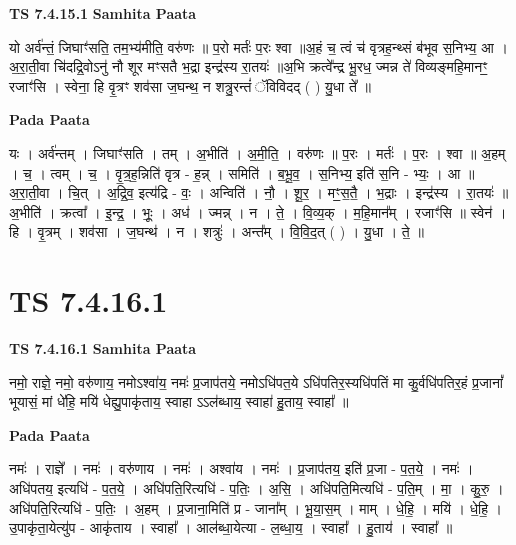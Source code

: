 \documentclass[17pt]{extarticle}
\begin{document}
\textbf{TS 7.4.15.1 } \newline
\textbf{Samhita Paata} \newline

यो अर्व॑न्तं॒ जिघाꣳ॑सति॒ तम॒भ्य॑मीति॒ वरु॑णः ॥ प॒रो मर्तः॑ प॒रः श्वा ॥अ॒हं च॒ त्वं च॑ वृत्रह॒न्थ्सं ब॑भूव स॒निभ्य॒ आ । अ॒रा॒ती॒वा चि॑दद्रि॒वोऽनु॑ नौ शूर मꣳसतै भ॒द्रा इन्द्र॑स्य रा॒तयः॑ ॥अ॒भि क्रत्वे᳚न्द्र भू॒रध॒ ज्मन्न ते॑ विव्यङ्महि॒मानꣳ॒॒ रजाꣳ॑सि । स्वेना॒ हि वृ॒त्रꣳ शव॑सा ज॒घन्थ॒ न शत्रु॒रन्तं॑ ॅविविदद् ( ) यु॒धा ते᳚ ॥ \newline

\textbf{Pada Paata} \newline

यः । अर्व॑न्तम् । जिघाꣳ॑सति । तम् । अ॒भीति॑ । अ॒मी॒ति॒ । वरु॑णः ॥ प॒रः । मर्तः॑ । प॒रः । श्वा ॥ अ॒हम् । च॒ । त्वम् । च॒ । वृ॒त्र॒ह॒न्निति॑ वृत्र - ह॒न्न् । समिति॑ । ब॒भू॒व॒ । स॒निभ्य॒ इति॑ स॒नि - भ्यः॒ । आ ॥ अ॒रा॒ती॒वा । चि॒त् । अ॒द्रि॒व॒ इत्य॑द्रि - वः॒ । अन्विति॑ । नौ॒ । शू॒र॒ । मꣳ॒॒स॒तै॒ । भ॒द्राः । इन्द्र॑स्य । रा॒तयः॑ ॥ अ॒भीति॑ । क्रत्वा᳚ । इ॒न्द्र॒ । भूः॒ । अध॑ । ज्मन्न् । न । ते॒ । वि॒व्य॒क् । म॒हि॒मान᳚म् । रजाꣳ॑सि ॥ स्वेन॑ । हि । वृ॒त्रम् । शव॑सा । ज॒घन्थ॑ । न । शत्रुः॑ । अन्त᳚म् । वि॒वि॒द॒त् ( ) । यु॒धा । ते॒ ॥  \newline




\section*{ TS 7.4.16.1 }

\textbf{TS 7.4.16.1 } \newline
\textbf{Samhita Paata} \newline

नमो॒ राज्ञे॒ नमो॒ वरु॑णाय॒ नमोऽश्वा॑य॒ नमः॑ प्र॒जाप॑तये॒ नमोऽधि॑पत॒ये ऽधि॑पतिर॒स्यधि॑पतिं मा कु॒र्वधि॑पतिर॒हं प्र॒जानां᳚ भूयासं॒ मां धे॑हि॒ मयि॑ धेह्यु॒पाकृ॑ताय॒ स्वाहा ऽऽल॑ब्धाय॒ स्वाहा॑ हु॒ताय॒ स्वाहा᳚ ॥ \newline

\textbf{Pada Paata} \newline

नमः॑ । राज्ञे᳚ । नमः॑ । वरु॑णाय । नमः॑ । अश्वा॑य । नमः॑ । प्र॒जाप॑तय॒ इति॑ प्र॒जा - प॒त॒ये॒ । नमः॑ । अधि॑पतय॒ इत्यधि॑ - प॒त॒ये॒ । अधि॑पति॒रित्यधि॑ - प॒तिः॒ । अ॒सि॒ । अधि॑पति॒मित्यधि॑ - प॒ति॒म् । मा॒ । कु॒रु॒ । अधि॑पति॒रित्यधि॑ - प॒तिः॒ । अ॒हम् । प्र॒जाना॒मिति॑ प्र - जाना᳚म् । भू॒या॒स॒म् । माम् । धे॒हि॒ । मयि॑ । धे॒हि॒ । उ॒पाकृ॑ता॒येत्यु॑प - आकृ॑ताय । स्वाहा᳚ । आल॑ब्धा॒येत्या - ल॒ब्धा॒य॒ । स्वाहा᳚ । हु॒ताय॑ । स्वाहा᳚ ॥  \newline
\end{document}
